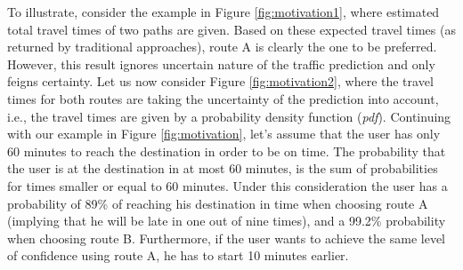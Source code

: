 % 
% 

To illustrate, consider the example in Figure \ref{fig:motivation1}, where
estimated total travel times of two paths are given. Based on these expected
travel times (as returned by traditional approaches), route A is clearly
the one to be preferred. However, this result ignores uncertain nature of the
traffic prediction and only feigns certainty. Let us now consider Figure \ref{fig:motivation2}, where the travel times for
both routes are taking the uncertainty of the prediction into account, i.e., the
travel times are given by a probability density function (\textit{pdf}).
Continuing with our example in Figure \ref{fig:motivation}, let's assume that the user has only 60  minutes to reach
the destination in order to be on time. The probability that the user is at the
destination in at most 60 minutes, is the sum of probabilities for times
smaller or equal to 60 minutes. Under this consideration the user has a
probability of 89\% of reaching his destination in time when choosing route A
(implying that he will be late in one out of nine times), and a 99.2\%
probability when choosing route B. Furthermore, if the user wants to achieve the
same level of confidence using route A, he has to start 10 minutes earlier.

